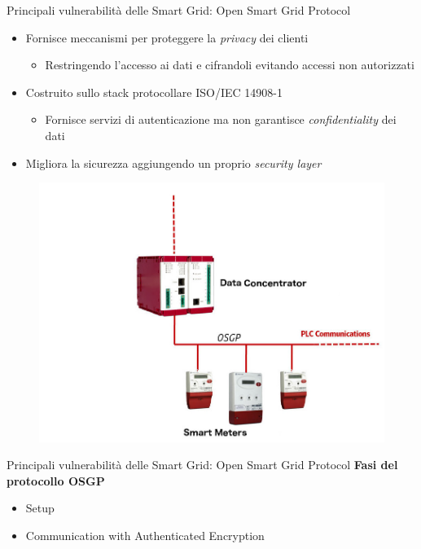 \begin{frame}{Principali vulnerabilità delle Smart Grid: Open Smart Grid Protocol}
	\begin{itemize}[<+- | alert@+>]
		\item Fornisce meccanismi per proteggere la \emph{privacy} dei clienti
		\begin{itemize}[<+- | alert@+>]
			\item Restringendo l'accesso ai dati e cifrandoli evitando accessi non autorizzati
		\end{itemize}
		\item Costruito sullo stack protocollare ISO/IEC 14908-1
		\begin{itemize}[<+- | alert@+>]
			\item Fornisce servizi di autenticazione ma non garantisce \emph{confidentiality} dei dati
		\end{itemize}
		\item Migliora la sicurezza aggiungendo un proprio \emph{security layer}
	\end{itemize}
	\begin{figure}[h]
		\includegraphics[scale=0.15,cfbox=blue_slides 1pt 0pt]{imgs/aggregator.jpg}
	\end{figure}
\end{frame}

\begin{frame}{Principali vulnerabilità delle Smart Grid: Open Smart Grid Protocol}
	\textbf{Fasi del protocollo OSGP}
	\begin{itemize}
		\item Setup
		\item Communication with Authenticated Encryption
	\end{itemize}
\end{frame}

